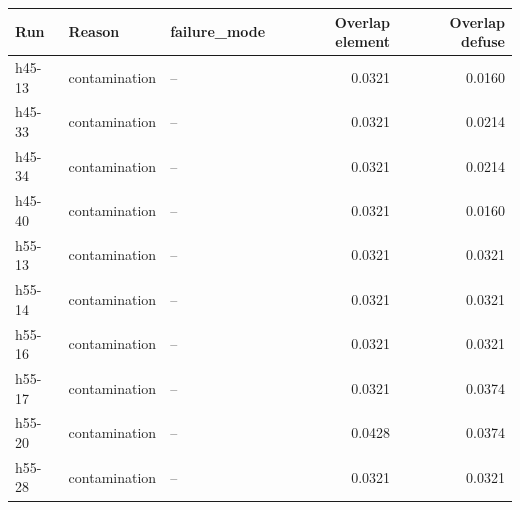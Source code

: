 \begin{tabular}{lllrr}
\toprule
Run & Reason & failure\_mode & Overlap element & Overlap defuse \\
\midrule
h45-13 & contamination & -- & 0.0321 & 0.0160 \\
h45-33 & contamination & -- & 0.0321 & 0.0214 \\
h45-34 & contamination & -- & 0.0321 & 0.0214 \\
h45-40 & contamination & -- & 0.0321 & 0.0160 \\
h55-13 & contamination & -- & 0.0321 & 0.0321 \\
h55-14 & contamination & -- & 0.0321 & 0.0321 \\
h55-16 & contamination & -- & 0.0321 & 0.0321 \\
h55-17 & contamination & -- & 0.0321 & 0.0374 \\
h55-20 & contamination & -- & 0.0428 & 0.0374 \\
h55-28 & contamination & -- & 0.0321 & 0.0321 \\
\bottomrule
\end{tabular}
